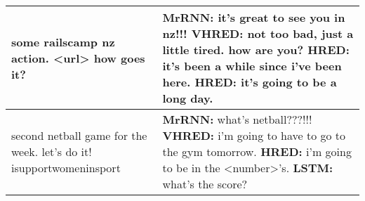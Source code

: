 \documentclass{article}
\begin{document}
\begin{table}[ht]
\begin{tabular}{p{45mm}|p{80mm}}
     some railscamp nz action. <url>  how goes it? & \textbf{MrRNN:} it's great to see you in nz!!!  \newline \textbf{VHRED:} not too bad, just a little tired. how are you? \newline \textbf{HRED:} it's been a while since i've been here. \newline \textbf{HRED:} it's going to be a long day.  \\ \hline 
     second netball game for the week. let's do it! isupportwomeninsport & \textbf{MrRNN:} what's netball???!!!  \newline \textbf{VHRED:} i'm going to have to go to the gym tomorrow. \newline \textbf{HRED:} i'm going to be in the <number>'s. \newline \textbf{LSTM:} what's the score? \\ \hline
 \end{tabular}
\end{table}


 
\end{document}
